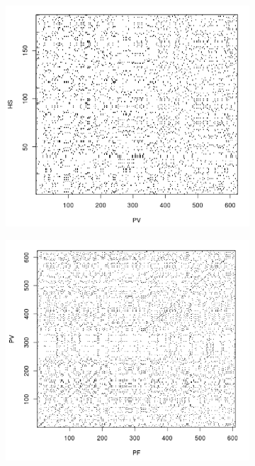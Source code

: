 \documentclass[compress]{beamer}
\begin{document}
\begin{frame}
\begin{figure}[h!]
   \begin{subfigure}[b]{0.35\textwidth}
    \centering
    \includegraphics[width=1.0\textwidth]{hs-pv}
   \end{subfigure}
    \begin{subfigure}[b]{0.35\textwidth}
    \centering
    \includegraphics[width=1.0\textwidth]{pv-pf}
   \end{subfigure}
\end{figure}

\end{frame}
\end{document}
